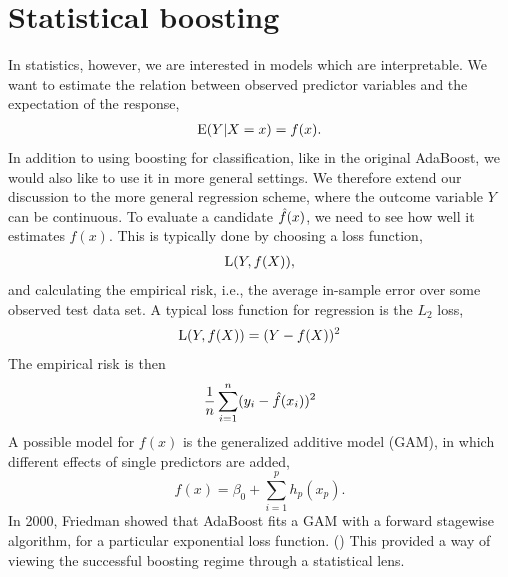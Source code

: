 \section{Statistical boosting}\label{sec:sboost}
In statistics, however, we are interested in models which are interpretable. We want to estimate the relation between observed predictor variables and the expectation of the response,
\begin{align}
    \operatorname{E}(Y|X=x)=f(x).
\end{align}
In addition to using boosting for classification, like in the original AdaBoost, we would also like to use it in more general settings. We therefore extend our discussion to the more general regression scheme, where the outcome variable $Y$ can be continuous. To evaluate a candidate $\hat{f}(x)$, we need to see how well it estimates $f(x)$. This is typically done by choosing a loss function,
\begin{align}\label{eq:loss}
    \operatorname{L}(Y, f(X)),
\end{align}
and calculating the empirical risk, i.e., the average in-sample error over some observed test data set. A typical loss function for regression is the $L_2$ loss,
\begin{align}
    \operatorname{L}(Y, f(X))=(Y-f(X))^2
\end{align}
The empirical risk is then
\begin{align}
    \frac{1}{n}\sum_{i=1}^n (y_i-\hat{f}(x_i))^2
\end{align}
A possible model for $f(x)$ is the generalized additive model (GAM), in which different effects of single predictors are added,
\begin{equation}\label{eq:gam}
    f(x)=\beta_0+\sum_{i=1}^p h_p(x_p).
\end{equation}
In 2000, Friedman showed that AdaBoost fits a GAM with a forward stagewise algorithm, for a particular exponential loss function. (\cite{friedman2000}) This provided a way of viewing the successful boosting regime through a statistical lens.

